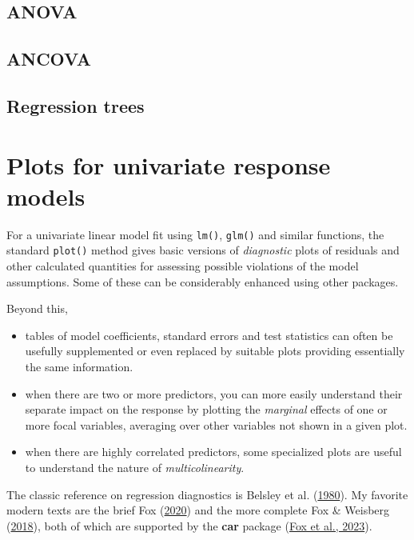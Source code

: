 \documentclass[
  letterpaper,
  10pt,
  krantz2]{krantz}
\begin{document}
\hypertarget{anova}{%
\section{ANOVA}\label{anova}}

\hypertarget{ancova}{%
\section{ANCOVA}\label{ancova}}

\hypertarget{regression-trees}{%
\section{Regression trees}\label{regression-trees}}


\hypertarget{sec-linear-models-plots}{%
\chapter{Plots for univariate response
models}\label{sec-linear-models-plots}}

For a univariate linear model fit using \texttt{lm()}, \texttt{glm()}
and similar functions, the standard \texttt{plot()} method gives basic
versions of \emph{diagnostic} plots of residuals and other calculated
quantities for assessing possible violations of the model assumptions.
Some of these can be considerably enhanced using other packages.

Beyond this,

\begin{itemize}
\item
  tables of model coefficients, standard errors and test statistics can
  often be usefully supplemented or even replaced by suitable plots
  providing essentially the same information.
\item
  when there are two or more predictors, you can more easily understand
  their separate impact on the response by plotting the \emph{marginal}
  effects of one or more focal variables, averaging over other variables
  not shown in a given plot.
\item
  when there are highly correlated predictors, some specialized plots
  are useful to understand the nature of \emph{multicolinearity}.
\end{itemize}

The classic reference on regression diagnostics is Belsley et al.
(\protect\hyperlink{ref-Belsley-etal:80}{1980}). My favorite modern
texts are the brief Fox (\protect\hyperlink{ref-Fox2020}{2020}) and the
more complete Fox \& Weisberg
(\protect\hyperlink{ref-FoxWeisberg:2018}{2018}), both of which are
supported by the \textbf{car} package (\protect\hyperlink{ref-R-car}{Fox
et al., 2023}).
\end{document}
